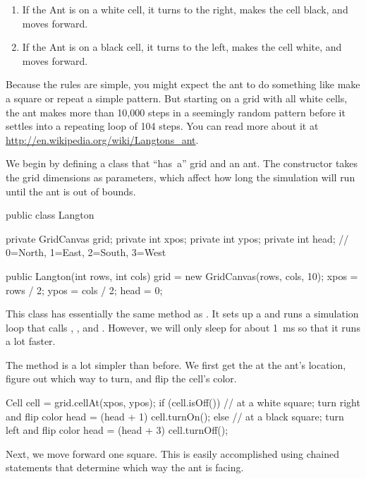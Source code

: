 \begin{enumerate}
\item If the Ant is on a white cell, it turns to the right, makes the cell black, and moves forward.
\item If the Ant is on a black cell, it turns to the left, makes the cell white, and moves forward.
\end{enumerate}

Because the rules are simple, you might expect the ant to do something like make a square or repeat a simple pattern.
But starting on a grid with all white cells, the ant makes more than 10,000 steps in a seemingly random pattern before it settles into a repeating loop of 104 steps.
You can read more about it at \url{http://en.wikipedia.org/wiki/Langtons_ant}.

We begin by defining a  class that ``has~a'' grid and an ant.
The constructor takes the grid dimensions as parameters, which affect how long the simulation will run until the ant is out of bounds.

\begin{code}
public class Langton {
    private GridCanvas grid;
    private int xpos;
    private int ypos;
    private int head; // 0=North, 1=East, 2=South, 3=West

    public Langton(int rows, int cols) {
        grid = new GridCanvas(rows, cols, 10);
        xpos = rows / 2;
        ypos = cols / 2;
        head = 0;
    }
}
\end{code}

This class has essentially the same  method as .
It sets up a  and runs a simulation loop that calls , , and .
However, we will only sleep for about 1~ms so that it runs a lot faster.

The  method is a lot simpler than before.
We first get the  at the ant's location, figure out which way to turn, and flip the cell's color.

\begin{code}
Cell cell = grid.cellAt(xpos, ypos);
if (cell.isOff()) {
    // at a white square; turn right and flip color
    head = (head + 1) %
    cell.turnOn();
} else {
    // at a black square; turn left and flip color
    head = (head + 3) %
    cell.turnOff();
}
\end{code}

Next, we move forward one square.
This is easily accomplished using chained  statements that determine which way the ant is facing.

